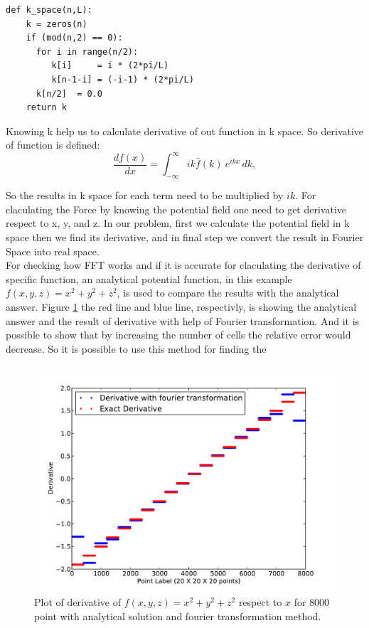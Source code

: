 \documentclass[10pt]{article}
\begin{document}
\begin{verbatim}
def k_space(n,L):
    k = zeros(n)
    if (mod(n,2) == 0):
      for i in range(n/2):
         k[i]     = i * (2*pi/L)
         k[n-1-i] = (-i-1) * (2*pi/L)
      k[n/2]  = 0.0
    return k
\end{verbatim}

Knowing k help us to calculate derivative of out function in k space. So derivative of function is defined:\\

\begin{equation}
    \frac{df(x)}{dx} = \int_{-\infty}^{\infty} i k \hat{f}(k)\ e^{ i k x}\,dk,  
\end{equation}

So the results in k space for each term need to be multiplied by $i k$. For claculating the Force by knowing the potential field one need to get derivative respect to x, y, and z. In our problem, first we calculate the potential field in k space then we find its derivative, and in final step we convert the result in Fourier Space into real space.\\

For checking how FFT works and if it is accurate for claculating the derivative of specific function, an analytical potential function, in this example $f(x,y,z) = x^2 + y^2 + z^2 $, is used to compare the results with the analytical answer. Figure \ref{fig:FourierTest} the red line and blue line, respectivly, is showing the analytical answer and the result of derivative with help of Fourier transformation. And it is possible to show that by increasing the number of cells the relative error would decrease. So it is possible to use this method for finding the 

\begin{figure}[hbt]
  \begin{center}
    \includegraphics[scale=0.6]{Plots/FourierSeries/plotFourier20.pdf}
    \caption{\label{fig:FourierTest} Plot of derivative of $f(x,y,z) = x^2 + y^2 + z^2$ respect to $x$ for $8000$ point with analytical solution and fourier transformation method.}
  \end{center}
\end{figure}
\end{document}
